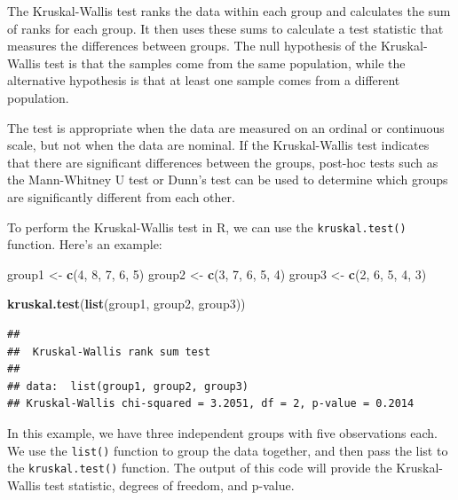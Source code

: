 \documentclass[
]{ctexart}
\newenvironment{Shaded}{\begin{snugshade}}{\end{snugshade}}
\newcommand{\DecValTok}[1]{\textcolor[rgb]{0.00,0.00,0.81}{#1}}
\newcommand{\FunctionTok}[1]{\textcolor[rgb]{0.13,0.29,0.53}{\textbf{#1}}}
\newcommand{\NormalTok}[1]{#1}
\newcommand{\OtherTok}[1]{\textcolor[rgb]{0.56,0.35,0.01}{#1}}
\begin{document}
The Kruskal-Wallis test ranks the data within each group and calculates
the sum of ranks for each group. It then uses these sums to calculate a
test statistic that measures the differences between groups. The null
hypothesis of the Kruskal-Wallis test is that the samples come from the
same population, while the alternative hypothesis is that at least one
sample comes from a different population.

The test is appropriate when the data are measured on an ordinal or
continuous scale, but not when the data are nominal. If the
Kruskal-Wallis test indicates that there are significant differences
between the groups, post-hoc tests such as the Mann-Whitney U test or
Dunn's test can be used to determine which groups are significantly
different from each other.

To perform the Kruskal-Wallis test in R, we can use the
\texttt{kruskal.test()} function. Here's an example:

\begin{Shaded}
\begin{Highlighting}[]
\NormalTok{group1 }\OtherTok{\textless{}{-}} \FunctionTok{c}\NormalTok{(}\DecValTok{4}\NormalTok{, }\DecValTok{8}\NormalTok{, }\DecValTok{7}\NormalTok{, }\DecValTok{6}\NormalTok{, }\DecValTok{5}\NormalTok{)}
\NormalTok{group2 }\OtherTok{\textless{}{-}} \FunctionTok{c}\NormalTok{(}\DecValTok{3}\NormalTok{, }\DecValTok{7}\NormalTok{, }\DecValTok{6}\NormalTok{, }\DecValTok{5}\NormalTok{, }\DecValTok{4}\NormalTok{)}
\NormalTok{group3 }\OtherTok{\textless{}{-}} \FunctionTok{c}\NormalTok{(}\DecValTok{2}\NormalTok{, }\DecValTok{6}\NormalTok{, }\DecValTok{5}\NormalTok{, }\DecValTok{4}\NormalTok{, }\DecValTok{3}\NormalTok{)}

\FunctionTok{kruskal.test}\NormalTok{(}\FunctionTok{list}\NormalTok{(group1, group2, group3))}
\end{Highlighting}
\end{Shaded}

\begin{verbatim}
## 
##  Kruskal-Wallis rank sum test
## 
## data:  list(group1, group2, group3)
## Kruskal-Wallis chi-squared = 3.2051, df = 2, p-value = 0.2014
\end{verbatim}

In this example, we have three independent groups with five observations
each. We use the \texttt{list()} function to group the data together,
and then pass the list to the \texttt{kruskal.test()} function. The
output of this code will provide the Kruskal-Wallis test statistic,
degrees of freedom, and p-value.
\end{document}
